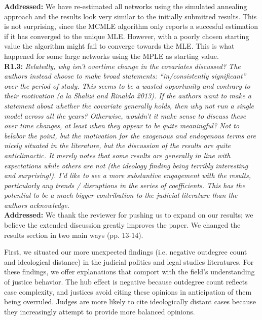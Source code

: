 \documentclass[a4paper,11pt]{texMemo}
\begin{document}
\noindent \textbf{Addressed:} We have re-estimated all networks using the simulated annealing approach and the results look very similar to the initially submitted results. This is not surprising, since the MCMLE algorithm only reports a succesful estimation if it has converged to the unique MLE. However, with a poorly chosen starting value the algorithm might fail to converge towards the MLE. This is what happened for some large networks using the MPLE as starting value.  \\

\noindent \textbf{R1.3:} \emph{ Relatedly, why isn’t overtime change in the covariates discussed? The authors instead choose to make broad statements: “in/consistently significant” over the period of study.  This seems to be a wasted opportunity and contrary to their motivation (a la Shalizi and Rinaldo 2013). If the authors want to make a statement about whether the covariate generally holds, then why not run a single model across all the years? Otherwise, wouldn’t it make sense to discuss these over time changes, at least when they appear to be quite meaningful? Not to belabor the point, but the motivation for the exogenous and endogenous terms are nicely situated in the literature, but the discussion of the results are quite anticlimactic. It merely notes that some results are generally in line with expectations while others are not (the ideology finding being terribly interesting and surprising!). I’d like to see a more substantive engagement with the results, particularly any trends / disruptions in the series of coefficients. This has the potential to be a much bigger contribution to the judicial literature than the authors acknowledge. }\\


\noindent \textbf{Addressed:} We thank the reviewer for pushing us to expand on our results; we believe the extended discussion greatly improves the paper. We changed the results section in two main ways (pp. 13-14). 

First, we situated our more unexpected findings (i.e. negative outdegree count and ideological distance) in the judicial politics and legal studies literatures. For these findings, we offer explanations that comport with the field's understanding of justice behavior. The hub effect is negative because outdegree count reflects case complexity, and justices avoid citing these opinions in anticipation of them being overruled. Judges are more likely to cite ideologically distant cases because they increasingly attempt to provide more balanced opinions.
\end{document}
